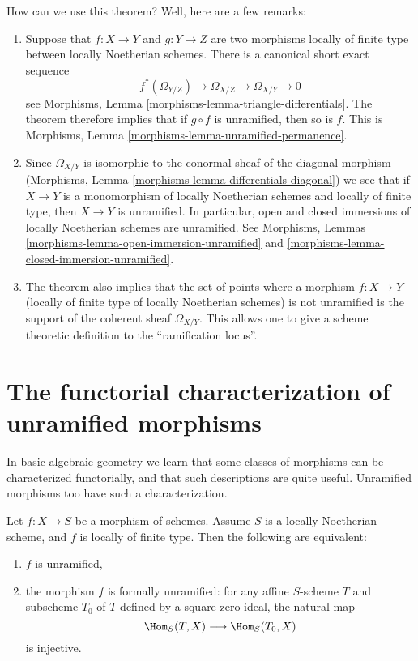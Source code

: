 \noindent
How can we use this theorem? Well, here are a few remarks:
\begin{enumerate}
\item Suppose that
$f : X \to Y$ and $g : Y \to Z$ are two morphisms locally of finite
type between locally Noetherian schemes. There is a canonical short
exact sequence
$$
f^*(\Omega_{Y/Z}) \to \Omega_{X/Z} \to \Omega_{X/Y} \to 0
$$
see Morphisms, Lemma \ref{morphisms-lemma-triangle-differentials}.
The theorem therefore implies that if $g \circ f$ is unramified,
then so is $f$. This is
Morphisms, Lemma \ref{morphisms-lemma-unramified-permanence}.
\item Since $\Omega_{X/Y}$ is isomorphic to the conormal sheaf
of the diagonal morphism
(Morphisms, Lemma \ref{morphisms-lemma-differentials-diagonal})
we see that if $X \to Y$ is a monomorphism of
locally Noetherian schemes and locally of finite type,
then $X \to Y$ is unramified.
In particular, open and closed immersions of locally Noetherian schemes
are unramified. See
Morphisms, Lemmas
\ref{morphisms-lemma-open-immersion-unramified} and
\ref{morphisms-lemma-closed-immersion-unramified}.
\item The theorem also implies that the set of points
where a morphism $f : X \to Y$ (locally of finite type of locally Noetherian
schemes) is not unramified is
the support of the coherent sheaf $\Omega_{X/Y}$.
This allows one to give a scheme theoretic definition to the
``ramification locus''.
\end{enumerate}

\section{The functorial characterization of unramified morphisms}
\label{section-functorial-unramified}

\noindent
In basic algebraic geometry we learn that some classes of morphisms can be
characterized functorially, and that such descriptions are quite useful.
Unramified morphisms too have such a characterization.

\begin{theorem}
\label{theorem-formally-unramified}
Let $f : X \to S$ be a morphism of schemes.
Assume $S$ is a locally Noetherian scheme, and $f$ is locally of finite type.
Then the following are equivalent:
\begin{enumerate}
\item $f$ is unramified,
\item the morphism $f$ is formally unramified:
for any affine $S$-scheme $T$ and subscheme $T_0$ of $T$
defined by a square-zero ideal,
the natural map
$$
\Hom_S(T, X) \longrightarrow \Hom_S(T_0, X)
$$
is injective.
\end{enumerate}
\end{theorem}

